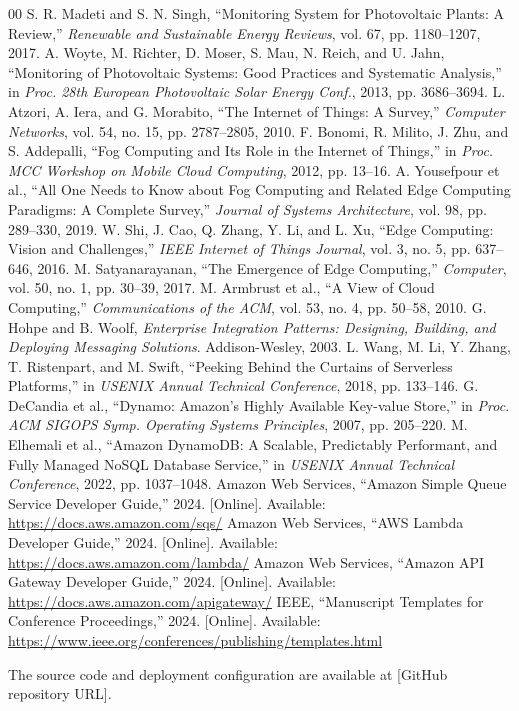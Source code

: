 \documentclass[conference]{IEEEtran}
\begin{document}
\begin{thebibliography}{00}
 S. R. Madeti and S. N. Singh, ``Monitoring System for Photovoltaic Plants: A Review,'' \emph{Renewable and Sustainable Energy Reviews}, vol. 67, pp. 1180--1207, 2017.
 A. Woyte, M. Richter, D. Moser, S. Mau, N. Reich, and U. Jahn, ``Monitoring of Photovoltaic Systems: Good Practices and Systematic Analysis,'' in \emph{Proc. 28th European Photovoltaic Solar Energy Conf.}, 2013, pp. 3686--3694.
 L. Atzori, A. Iera, and G. Morabito, ``The Internet of Things: A Survey,'' \emph{Computer Networks}, vol. 54, no. 15, pp. 2787--2805, 2010.
 F. Bonomi, R. Milito, J. Zhu, and S. Addepalli, ``Fog Computing and Its Role in the Internet of Things,'' in \emph{Proc. MCC Workshop on Mobile Cloud Computing}, 2012, pp. 13--16.
 A. Yousefpour et al., ``All One Needs to Know about Fog Computing and Related Edge Computing Paradigms: A Complete Survey,'' \emph{Journal of Systems Architecture}, vol. 98, pp. 289--330, 2019.
 W. Shi, J. Cao, Q. Zhang, Y. Li, and L. Xu, ``Edge Computing: Vision and Challenges,'' \emph{IEEE Internet of Things Journal}, vol. 3, no. 5, pp. 637--646, 2016.
 M. Satyanarayanan, ``The Emergence of Edge Computing,'' \emph{Computer}, vol. 50, no. 1, pp. 30--39, 2017.
 M. Armbrust et al., ``A View of Cloud Computing,'' \emph{Communications of the ACM}, vol. 53, no. 4, pp. 50--58, 2010.
 G. Hohpe and B. Woolf, \emph{Enterprise Integration Patterns: Designing, Building, and Deploying Messaging Solutions}. Addison-Wesley, 2003.
 L. Wang, M. Li, Y. Zhang, T. Ristenpart, and M. Swift, ``Peeking Behind the Curtains of Serverless Platforms,'' in \emph{USENIX Annual Technical Conference}, 2018, pp. 133--146.
 G. DeCandia et al., ``Dynamo: Amazon's Highly Available Key-value Store,'' in \emph{Proc. ACM SIGOPS Symp. Operating Systems Principles}, 2007, pp. 205--220.
 M. Elhemali et al., ``Amazon DynamoDB: A Scalable, Predictably Performant, and Fully Managed NoSQL Database Service,'' in \emph{USENIX Annual Technical Conference}, 2022, pp. 1037--1048.
 Amazon Web Services, ``Amazon Simple Queue Service Developer Guide,'' 2024. [Online]. Available: \url{https://docs.aws.amazon.com/sqs/}
 Amazon Web Services, ``AWS Lambda Developer Guide,'' 2024. [Online]. Available: \url{https://docs.aws.amazon.com/lambda/}
 Amazon Web Services, ``Amazon API Gateway Developer Guide,'' 2024. [Online]. Available: \url{https://docs.aws.amazon.com/apigateway/}
 IEEE, ``Manuscript Templates for Conference Proceedings,'' 2024. [Online]. Available: \url{https://www.ieee.org/conferences/publishing/templates.html}
\end{thebibliography}

The source code and deployment configuration are available at [GitHub repository URL].
\end{document}
